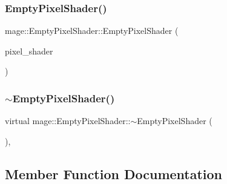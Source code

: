 \hypertarget{classmage_1_1_empty_pixel_shader_a151ae6546500995e33d34d0a2bfc5f49}{}\label{classmage_1_1_empty_pixel_shader_a151ae6546500995e33d34d0a2bfc5f49} 
\subsubsection{\texorpdfstring{Empty\+Pixel\+Shader()}{EmptyPixelShader()}\hspace{0.1cm}{\footnotesize\ttfamily [3/3]}}
{\footnotesize\ttfamily mage\+::\+Empty\+Pixel\+Shader\+::\+Empty\+Pixel\+Shader (\begin{DoxyParamCaption}\item[{\hyperlink{classmage_1_1_empty_pixel_shader}{Empty\+Pixel\+Shader} \&\&}]{pixel\+\_\+shader }\end{DoxyParamCaption})\hspace{0.3cm}{\ttfamily [default]}}

\hypertarget{classmage_1_1_empty_pixel_shader_ace5053e12d6fa60caa2bcca00d192fab}{}\label{classmage_1_1_empty_pixel_shader_ace5053e12d6fa60caa2bcca00d192fab} 
\subsubsection{\texorpdfstring{$\sim$\+Empty\+Pixel\+Shader()}{~EmptyPixelShader()}}
{\footnotesize\ttfamily virtual mage\+::\+Empty\+Pixel\+Shader\+::$\sim$\+Empty\+Pixel\+Shader (\begin{DoxyParamCaption}{ }\end{DoxyParamCaption})\hspace{0.3cm}{\ttfamily [virtual]}, {\ttfamily [default]}}



\subsection{Member Function Documentation}
\hypertarget{classmage_1_1_empty_pixel_shader_a7702fdae1d752ed422d1508e6ee08479}{}\label{classmage_1_1_empty_pixel_shader_a7702fdae1d752ed422d1508e6ee08479} 
